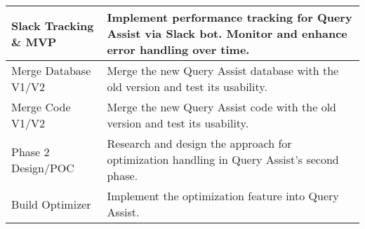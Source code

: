 \begin{table}[H]
\begin{tabular}{|p{4cm}|p{10cm}|}
            \hline
            Slack Tracking \& MVP & Implement performance tracking for Query Assist via Slack bot. Monitor and enhance error handling over time. \\
            \hline
            Merge Database V1/V2 & Merge the new Query Assist database with the old version and test its usability. \\
            \hline
            Merge Code V1/V2 & Merge the new Query Assist code with the old version and test its usability. \\
            \hline
            Phase 2 Design/POC & Research and design the approach for optimization handling in Query Assist's second phase. \\
            \hline
            Build Optimizer & Implement the optimization feature into Query Assist. \\
            \hline
        \end{tabular}
    \end{table}
\pagebreak
